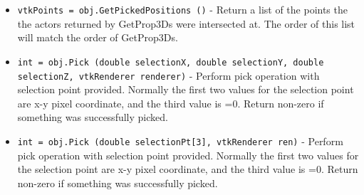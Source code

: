 \begin{itemize}
\item  \verb|vtkPoints = obj.GetPickedPositions ()| -  Return a list of the points the the actors returned by GetProp3Ds
 were intersected at. The order of this list will match the order of
 GetProp3Ds.

\item  \verb|int = obj.Pick (double selectionX, double selectionY, double selectionZ, vtkRenderer renderer)| -  Perform pick operation with selection point provided. Normally the 
 first two values for the selection point are x-y pixel coordinate, and
 the third value is =0. Return non-zero if something was successfully 
 picked.

\item  \verb|int = obj.Pick (double selectionPt[3], vtkRenderer ren)| -  Perform pick operation with selection point provided. Normally the first
 two values for the selection point are x-y pixel coordinate, and the
 third value is =0. Return non-zero if something was successfully picked.

\end{itemize}
